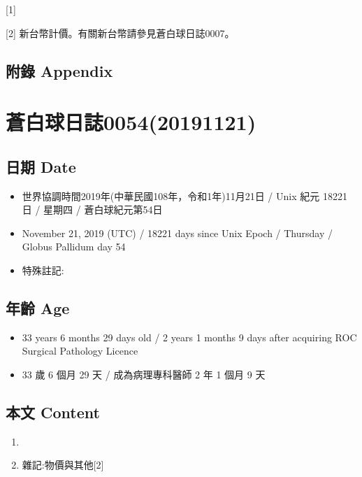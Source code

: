 \documentclass[a5paper, 12pt
]{book}
\providecommand{\tightlist}{%
  \setlength{\itemsep}{0pt}\setlength{\parskip}{0pt}}
\begin{document}
{[}1{]}

{[}2{]} 新台幣計價。有關新台幣請參見蒼白球日誌0007。

\hypertarget{ux9644ux9304-appendix-45}{%
\subsection{附錄 Appendix}\label{ux9644ux9304-appendix-45}}

\hypertarget{ux84bcux767dux7403ux65e5ux8a8c005420191121}{%
\section{蒼白球日誌0054(20191121)}\label{ux84bcux767dux7403ux65e5ux8a8c005420191121}}

\hypertarget{ux65e5ux671f-date-53}{%
\subsection{日期 Date}\label{ux65e5ux671f-date-53}}

\begin{itemize}
\tightlist
\item
  世界協調時間2019年(中華民國108年，令和1年)11月21日 / Unix 紀元 18221
  日 / 星期四 / 蒼白球紀元第54日
\item
  November 21, 2019 (UTC) / 18221 days since Unix Epoch / Thursday /
  Globus Pallidum day 54
\item
  特殊註記:
\end{itemize}

\hypertarget{ux5e74ux9f61-age-53}{%
\subsection{年齡 Age}\label{ux5e74ux9f61-age-53}}

\begin{itemize}
\tightlist
\item
  33 years 6 months 29 days old / 2 years 1 months 9 days after
  acquiring ROC Surgical Pathology Licence
\item
  33 歲 6 個月 29 天 / 成為病理專科醫師 2 年 1 個月 9 天
\end{itemize}

\hypertarget{ux672cux6587-content-53}{%
\subsection{本文 Content}\label{ux672cux6587-content-53}}

\begin{enumerate}
\def\labelenumi{\arabic{enumi}.}
\item
\item
  雜記:物價與其他{[}2{]}
\end{enumerate}
\end{document}
